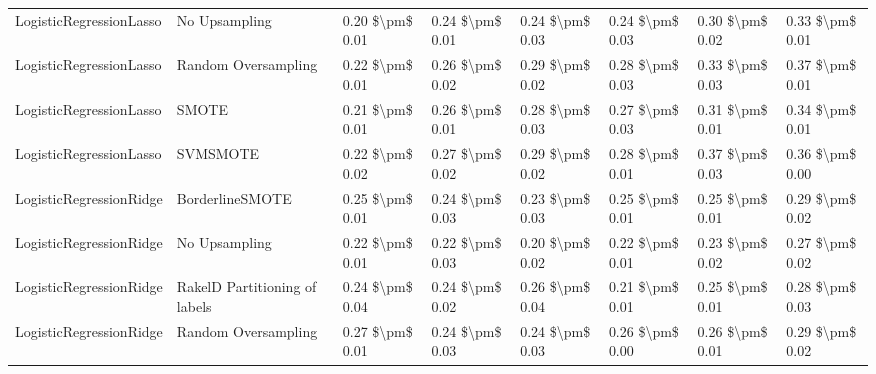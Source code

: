 \begin{tabular}{llllllll}
        LogisticRegressionLasso &                 No Upsampling &     0.20 \$\textbackslash pm\$ 0.01 &           0.24 \$\textbackslash pm\$ 0.01 &       0.24 \$\textbackslash pm\$ 0.03 &        0.24 \$\textbackslash pm\$ 0.03 &                         0.30 \$\textbackslash pm\$ 0.02 & 0.33 \$\textbackslash pm\$ 0.01 \\
        LogisticRegressionLasso &           Random Oversampling &     0.22 \$\textbackslash pm\$ 0.01 &           0.26 \$\textbackslash pm\$ 0.02 &       0.29 \$\textbackslash pm\$ 0.02 &        0.28 \$\textbackslash pm\$ 0.03 &                         0.33 \$\textbackslash pm\$ 0.03 & 0.37 \$\textbackslash pm\$ 0.01 \\
        LogisticRegressionLasso &                         SMOTE &     0.21 \$\textbackslash pm\$ 0.01 &           0.26 \$\textbackslash pm\$ 0.01 &       0.28 \$\textbackslash pm\$ 0.03 &        0.27 \$\textbackslash pm\$ 0.03 &                         0.31 \$\textbackslash pm\$ 0.01 & 0.34 \$\textbackslash pm\$ 0.01 \\
        LogisticRegressionLasso &                      SVMSMOTE &     0.22 \$\textbackslash pm\$ 0.02 &           0.27 \$\textbackslash pm\$ 0.02 &       0.29 \$\textbackslash pm\$ 0.02 &        0.28 \$\textbackslash pm\$ 0.01 &                         0.37 \$\textbackslash pm\$ 0.03 & 0.36 \$\textbackslash pm\$ 0.00 \\
        LogisticRegressionRidge &               BorderlineSMOTE &     0.25 \$\textbackslash pm\$ 0.01 &           0.24 \$\textbackslash pm\$ 0.03 &       0.23 \$\textbackslash pm\$ 0.03 &        0.25 \$\textbackslash pm\$ 0.01 &                         0.25 \$\textbackslash pm\$ 0.01 & 0.29 \$\textbackslash pm\$ 0.02 \\
        LogisticRegressionRidge &                 No Upsampling &     0.22 \$\textbackslash pm\$ 0.01 &           0.22 \$\textbackslash pm\$ 0.03 &       0.20 \$\textbackslash pm\$ 0.02 &        0.22 \$\textbackslash pm\$ 0.01 &                         0.23 \$\textbackslash pm\$ 0.02 & 0.27 \$\textbackslash pm\$ 0.02 \\
        LogisticRegressionRidge & RakelD Partitioning of labels &     0.24 \$\textbackslash pm\$ 0.04 &           0.24 \$\textbackslash pm\$ 0.02 &       0.26 \$\textbackslash pm\$ 0.04 &        0.21 \$\textbackslash pm\$ 0.01 &                         0.25 \$\textbackslash pm\$ 0.01 & 0.28 \$\textbackslash pm\$ 0.03 \\
        LogisticRegressionRidge &           Random Oversampling &     0.27 \$\textbackslash pm\$ 0.01 &           0.24 \$\textbackslash pm\$ 0.03 &       0.24 \$\textbackslash pm\$ 0.03 &        0.26 \$\textbackslash pm\$ 0.00 &                         0.26 \$\textbackslash pm\$ 0.01 & 0.29 \$\textbackslash pm\$ 0.02 \\

\end{tabular}
